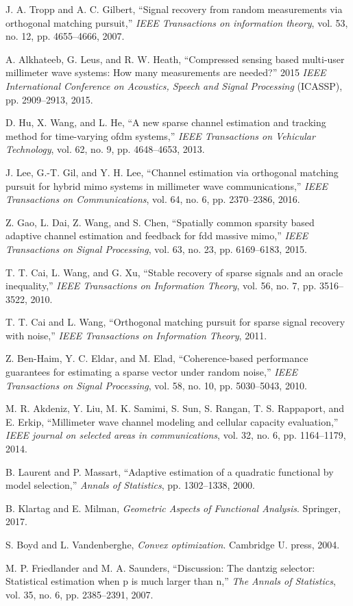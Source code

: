 \documentclass[journal]{IEEEtran}
\begin{document}
\begin{thebibliography}{30}
J. A. Tropp and A. C. Gilbert, “Signal recovery from random measurements via orthogonal matching pursuit,” \textit {IEEE Transactions on information theory}, vol. 53, no. 12, pp. 4655–4666, 2007.

A. Alkhateeb, G. Leus, and R. W. Heath, “Compressed sensing based multi-user millimeter wave systems: How many measurements are needed?” 2015 \textit {IEEE International Conference on Acoustics, Speech and Signal Processing} (ICASSP), pp. 2909–2913, 2015.

D. Hu, X. Wang, and L. He, “A new sparse channel estimation and tracking method for time-varying ofdm systems,” \textit {IEEE Transactions on Vehicular Technology}, vol. 62, no. 9, pp. 4648–4653, 2013.

J. Lee, G.-T. Gil, and Y. H. Lee, “Channel estimation via orthogonal matching pursuit for hybrid mimo systems in millimeter wave communications,” \textit {IEEE Transactions on Communications}, vol. 64, no. 6, pp. 2370–2386, 2016.

Z. Gao, L. Dai, Z. Wang, and S. Chen, “Spatially common sparsity based adaptive channel estimation and feedback for fdd massive mimo,” \textit {IEEE Transactions on Signal Processing}, vol. 63, no. 23, pp. 6169–6183, 2015.

T. T. Cai, L. Wang, and G. Xu, “Stable recovery of sparse signals and an oracle inequality,” \textit {IEEE Transactions on Information Theory}, vol. 56, no. 7, pp. 3516–3522, 2010.

T. T. Cai and L. Wang, “Orthogonal matching pursuit for sparse signal recovery with noise,” \textit {IEEE Transactions on Information Theory}, 2011.

Z. Ben-Haim, Y. C. Eldar, and M. Elad, “Coherence-based performance guarantees for estimating a sparse vector under random noise,” \textit {IEEE Transactions on Signal Processing}, vol. 58, no. 10, pp. 5030–5043, 2010.

M. R. Akdeniz, Y. Liu, M. K. Samimi, S. Sun, S. Rangan, T. S. Rappaport, and E. Erkip, “Millimeter wave channel modeling and cellular capacity evaluation,” \textit {IEEE journal on selected areas in communications}, vol. 32, no. 6, pp. 1164–1179, 2014.

B. Laurent and P. Massart, “Adaptive estimation of a quadratic functional by model selection,” \textit {Annals of Statistics}, pp. 1302–1338, 2000.

B. Klartag and E. Milman, \textit {Geometric Aspects of Functional Analysis}. Springer, 2017.

S. Boyd and L. Vandenberghe, \textit {Convex optimization}. Cambridge U. press, 2004.

M. P. Friedlander and M. A. Saunders, “Discussion: The dantzig selector: Statistical estimation when p is much larger than n,” \textit {The Annals of Statistics}, vol. 35, no. 6, pp. 2385–2391, 2007.

\end{thebibliography}
\end{document}

